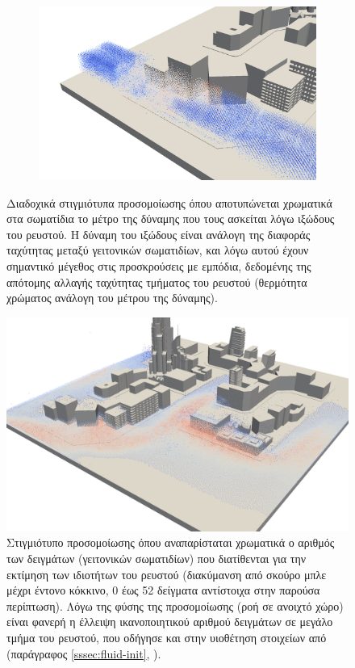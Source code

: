 \begin{figure}
\begin{subfigure}{.5\textwidth}
  \end{subfigure}
  \begin{subfigure}{.5\textwidth}
    \centering
    \includegraphics[width=\textwidth]{figures/visc-3.png}
  \end{subfigure}
  \caption[Δυνάμεις ιξώδους]{Διαδοχικά στιγμιότυπα προσομοίωσης όπου αποτυπώνεται
    χρωματικά στα σωματίδια το μέτρο της δύναμης που τους ασκείται λόγω ιξώδους του
    ρευστού. Η δύναμη του ιξώδους είναι ανάλογη της διαφοράς ταχύτητας μεταξύ γειτονικών
    σωματιδίων, και λόγω αυτού έχουν σημαντικό μέγεθος στις προσκρούσεις με εμπόδια,
    δεδομένης της απότομης αλλαγής ταχύτητας τμήματος του ρευστού (θερμότητα χρώματος
    ανάλογη του μέτρου της δύναμης).}
  \label{fig:viscosity-forces}
\end{figure}

\begin{figure}
  \centering
  \includegraphics[width=\textwidth]{figures/samples.png}
  \caption[Απεικόνιση γειτονικών σωματιδίων] {Στιγμιότυπο προσομοίωσης όπου αναπαρίσταται
    χρωματικά ο αριθμός των δειγμάτων (γειτονικών σωματιδίων) που διατίθενται για την
    εκτίμηση των ιδιοτήτων του ρευστού (διακύμανση από σκούρο μπλε μέχρι έντονο κόκκινο, 0
    έως 52 δείγματα αντίστοιχα στην παρούσα περίπτωση). Λόγω της φύσης της προσομοίωσης
    (ροή σε ανοιχτό χώρο) είναι φανερή η έλλειψη ικανοποιητικού αριθμού δειγμάτων σε
    μεγάλο τμήμα του ρευστού, που οδήγησε και στην υιοθέτηση στοιχείων από 
    (παράγραφος \ref{sssec:fluid-init}, \cite{Muller2007109, macklin2013position}).}
  \label{fig:samples}
\end{figure}

